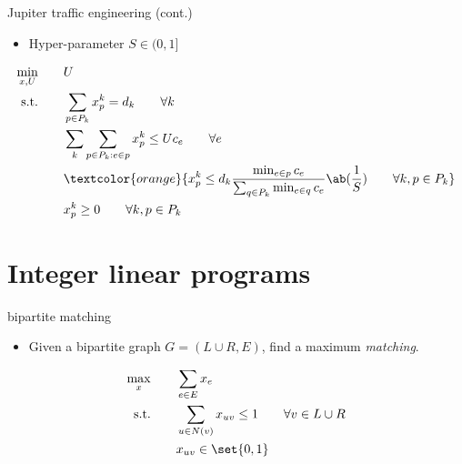 \documentclass[aspectratio=169, handout]{beamer}
\begin{document}
\begin{frame}{Jupiter traffic engineering (cont.)}
    \begin{itemize}
        \item Hyper-parameter $S \in (0, 1]$
    \end{itemize}

    \vspace{-\baselineskip}

    \begin{align*}
        \min_{x, U} \qquad & U                                                                                                                                                   \\
        \text{s.t.} \qquad & \sum_{p \in P_k} x^k_p = d_k   \qquad \forall k                                                                                                     \\
                           & \sum_k \sum_{p \in P_k : e \in p} x^k_p \le U c_e \qquad \forall e                                                                                  \\
                           & \textcolor{orange}{x^k_p \le d_k \frac{ \min_{e \in p} c_e }{ \sum_{q \in P_k} \min_{e \in q} c_e } \ab( \frac{1}{S} ) \qquad \forall k, p \in P_k} \\
                           & x^k_p \ge 0                    \qquad \forall k, p \in P_k
    \end{align*}

\end{frame}

\section{Integer linear programs}
\frame{\tableofcontents[currentsection]}

\begin{frame}{bipartite matching}
    \begin{itemize}
        \item Given a bipartite graph $G = (L \cup R, E)$, find a maximum \emph{matching}.
    \end{itemize}

    \pause

    \begin{align*}
        \max_{x} \qquad    & \sum_{e \in E} x_e                                           \\
        \text{s.t.} \qquad & \sum_{u \in N(v)} x_{uv} \le 1 \qquad \forall v \in L \cup R \\
                           & x_{uv} \in \set{0, 1}
    \end{align*}
\end{frame}
\end{document}
